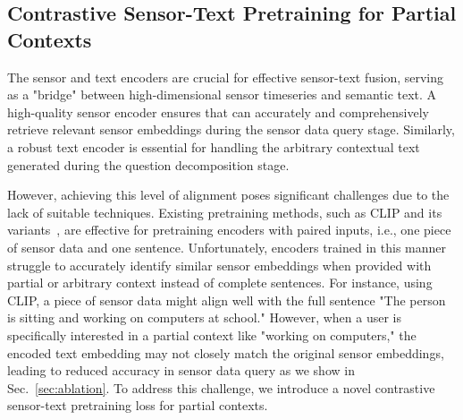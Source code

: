 \subsection{Contrastive Sensor-Text Pretraining for Partial Contexts}
\label{sec:pretraining}

The sensor and text encoders are crucial for effective sensor-text fusion, serving as a "bridge" between high-dimensional sensor timeseries and semantic text. A high-quality sensor encoder ensures that \Method can accurately and comprehensively retrieve relevant sensor embeddings during the sensor data query stage. Similarly, a robust text encoder is essential for handling the arbitrary contextual text generated during the question decomposition stage.

However, achieving this level of alignment poses significant challenges due to the lack of suitable techniques. Existing pretraining methods, such as CLIP and its variants~\cite{radford2021learning,moon-etal-2023-imu2clip}, are effective for pretraining encoders with paired inputs, i.e., one piece of sensor data and one sentence. Unfortunately, encoders trained in this manner struggle to accurately identify similar sensor embeddings when provided with partial or arbitrary context instead of complete sentences.
For instance, using CLIP, a piece of sensor data might align well with the full sentence "The person is sitting and working on computers at school." However, when a user is specifically interested in a partial context like "working on computers," the encoded text embedding may not closely match the original sensor embeddings, leading to reduced accuracy in sensor data query as we show in Sec.~\ref{sec:ablation}. To address this challenge, we introduce a novel contrastive sensor-text pretraining loss for partial contexts.



